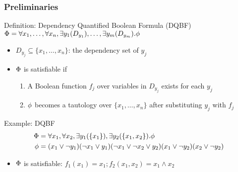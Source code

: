 \begin{frame}
      \frametitle{Preliminaries}
      \begin{block}{Definition: Dependency Quantified Boolean Formula (DQBF)}
            $\Phi=\forall x_1, \ldots, \forall x_n, \exists y_1(D_{y_1}), \ldots, \exists y_m(D_{y_m}).\phi$
            \begin{itemize}
                  \item $D_{y_j} \subseteq \{x_1,\ldots,x_n\}$: the \alert{dependency set} of $y_j$
                  \item $\Phi$ is satisfiable if
                        \begin{enumerate}
                              \item A Boolean function $f_j$ over variables in $D_{y_j}$ exists for each $y_j$
                              \item $\phi$ becomes a tautology over $\{x_1,\ldots,x_n\}$ after substituting $y_j$ with $f_j$
                        \end{enumerate}
            \end{itemize}
      \end{block}
      \pause
      \begin{block}{Example: DQBF}
            \abovedisplayskip=0pt
            \belowdisplayskip=0pt
            \begin{align*}
                  \Phi & = \forall x_1,\forall x_2,\exists y_1(\{x_1\}),\exists y_2(\{x_1,x_2\}).\phi \\
                  \phi & = (x_1 \lor \lnot y_1)
                  (\lnot x_1 \lor y_1)
                  (\lnot x_1 \lor \lnot x_2 \lor y_2)
                  (x_1 \lor \lnot y_2)
                  (x_2 \lor \lnot y_2)
            \end{align*}
            \begin{itemize}
                  \item $\Phi$ is satisfiable: $f_1(x_1)=x_1;f_2(x_1,x_2)=x_1 \land x_2$
            \end{itemize}
      \end{block}
\end{frame}